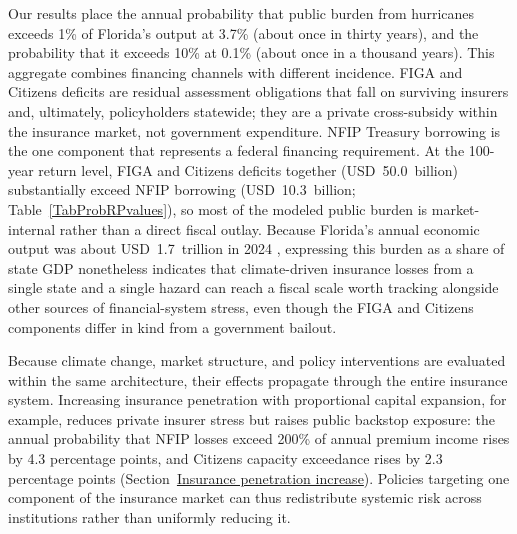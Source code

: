\documentclass[fleqn,10pt]{wlscirep}
\begin{document}
Our results place the annual probability that public burden from hurricanes exceeds 1\% of Florida's output at 3.7\% (about once in thirty years), and the probability that it exceeds 10\% at 0.1\% (about once in a thousand years). This aggregate combines financing channels with different incidence. FIGA and Citizens deficits are residual assessment obligations that fall on surviving insurers and, ultimately, policyholders statewide; they are a private cross-subsidy within the insurance market, not government expenditure. NFIP Treasury borrowing is the one component that represents a federal financing requirement. At the 100-year return level, FIGA and Citizens deficits together (USD~50.0~billion) substantially exceed NFIP borrowing (USD~10.3~billion; Table~\ref{TabProbRPvalues}), so most of the modeled public burden is market-internal rather than a direct fiscal outlay. Because Florida's annual economic output was about USD~1.7~trillion in 2024 \cite{bea_florida_gdp_2026}, expressing this burden as a share of state GDP nonetheless indicates that climate-driven insurance losses from a single state and a single hazard can reach a fiscal scale worth tracking alongside other sources of financial-system stress, even though the FIGA and Citizens components differ in kind from a government bailout.\medskip

Because climate change, market structure, and policy interventions are evaluated within the same architecture, their effects propagate through the entire insurance system. Increasing insurance penetration with proportional capital expansion, for example, reduces private insurer stress but raises public backstop exposure: the annual probability that NFIP losses exceed 200\% of annual premium income rises by 4.3 percentage points, and Citizens capacity exceedance rises by 2.3 percentage points (Section~\hyperref[ResPenetration]{Insurance penetration increase}). Policies targeting one component of the insurance market can thus redistribute systemic risk across institutions rather than uniformly reducing it.\medskip
\end{document}
